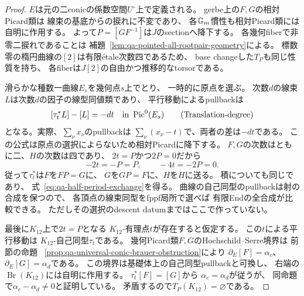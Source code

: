 \begin{proof}
$E$は元の二conicの係数空間$U^\circ$上で定義される。
gerbe上の$F,G$の相対Picard類は
線束の基底からの捩れに不変であり、
各$\mathbb G_m$慣性も相対Picard類には自明に作用する。
よって$P=[GF^{-1}]$は$J$のsectionへ降下する。
各幾何fiberで非零二捩れであることは
補題~\ref{lem:qa-pointed-all-rootpair-geometry}による。
標数零の楕円曲線の$[2]$は有限\'{e}tale次数四であるため、
base changeした$T_P$も同じ性質を持ち、
各fiberは$J[2]$の自由かつ推移的なtorsorである。

滑らかな種数一曲線$E_s$を幾何点$s$上でとり、
一時的に原点を選ぶ。
次数$d$の線束$L$は次数$d$の因子の線型同値類であり、
平行移動によるpullbackは
\[
 [\tau_t^*L]-[L]=-d t\quad\text{in }\operatorname{Pic}^0(E_s)
 \tag{Translation-degree}\label{eq:qa-half-period-degree}
\]
となる。実際、$\sum_\nu x_\nu$のpullbackは
$\sum_\nu(x_\nu-t)$で、両者の差は$-dt$である。
この公式は原点の選択によらないため相対Picardに降下する。
$F,G$の次数はともに二、$H$の次数は四であり、
$2t=P$かつ$2P=0$だから
\[
 -2t=-P=P,\qquad -4t=-2P=0.
\]
従って$\tau_t^*$は$F$を$FP=G$に、
$G$を$GP=F$に、$H$を$H$に送る。
積についても同じであり、
式~\eqref{eq:qa-half-period-exchange}を得る。
曲線の自己同型のpullbackは射の合成を保つので、
各頂点の線束同型をfppf局所で選べば
有限Endの全合成が比較できる。
ただしその選択のdescent datumまではここで作っていない。

最後に$K_{12}$上で$2t=P$となる
$K_{12}$-有理点$t$が存在すると仮定する。
この$t$による平行移動は
$K_{12}$-自己同型$\tau_t$である。
幾何Picard類$F,G$のHochschild--Serre境界は
前節の命題~
\ref{prop:qa-universal-conic-brauer-obstruction}により
$\partial_E[F]=\alpha_c$、
$\partial_E[G]=\alpha_d$である。
この境界は基礎体上の自己同型pullbackと可換し、
右端の$\operatorname{Br}(K_{12})$には自明に作用する。
$\tau_t^*[F]=[G]$から
$\alpha_c=\alpha_d$が従うが、
同命題で$\alpha_c-\alpha_d\ne0$と証明している。
矛盾するので$T_P(K_{12})=\varnothing$である。
\end{proof}

